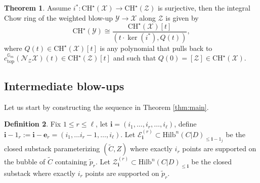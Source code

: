 \documentclass[10.5pt]{amsart}
\theoremstyle{definition}
\theoremstyle{definition}
\theoremstyle{definition}
\theoremstyle{definition}
\newtheorem{theorem}{Theorem}[section]
\newtheorem{definition}[theorem]{Definition}
\newcommand{\G}{\mathbb{G}}
\newcommand{\Hilb}{\mathrm{Hilb}}
\newcommand{\CH}{\mathrm{CH}}
\newcommand{\CHs}{\mathrm{CH}^\star}
\newcommand{\cZ}{\mathcal{Z}}
\newcommand{\cE}{\mathcal{E}}
\newcommand{\cX}{\mathcal{X}}
\newcommand{\cY}{\mathcal{Y}}
\newcommand{\bi}{\boldsymbol{i}}
\begin{document}
\begin{theorem}\cite[Corollary 6.5]{Arena2025} \label{keel}
    Assume $i^*:\CHs(\cX)\to \CH^\star(\cZ)$ is surjective, then the integral Chow ring of the weighted blow-up $\cY\to \cX$ along $\cZ$ is given by
$$\CH^\star(\cY)\cong \frac{\CH^\star(\cX)[t]}{(t\cdot \ker(i^*), Q(t))},$$
where $Q(t)\in \CHs(\cX)[t]$ is any polynomial that pulls back to $c_{\mathrm{top}}^{\G_m}(\mathcal{N}_\cZ \cX)(t)\in \CHs(\cZ)[t]$ and such that $Q(0)=[\cZ] \in \CH^\star(\cX)$.
\end{theorem}



\subsection{Intermediate blow-ups}\label{sec:inducstep}

Let us start by constructing the sequence in Theorem \ref{thm:main}.

\begin{definition}\label{defn:EpsilonI}
    Fix $1\leq r\leq \ell$, let $\bi=(i_1,\dots,i_r,\dots, i_\ell)$, define $\bi-1_r:=\bi-\mathbf{e}_{r}=(i_1, \dots i_r-1, \dots, i_\ell).$ Let $\cE_{\bi}^{(r)} \subset \Hilb^n(C|D)_{\le \bi-1_j}$ be the closed substack parameterizing $(\tilde{C}, Z)$ where exactly $i_r$ points are supported on the bubble of $\tilde C$ containing $\tilde p_r$. Let $\cZ^{(r)}_{\bi} \subset \Hilb^n(C|D)_{\le \bi}$ be the closed substack where exactly $i_r$ points are supported on $\tilde{p}_r.$
\end{definition}
\end{document}
